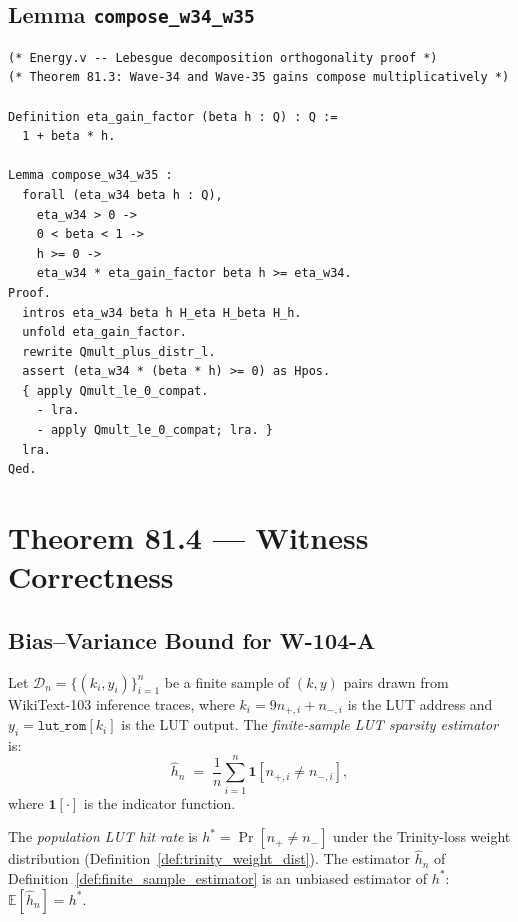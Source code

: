 \subsection{Lemma \texttt{compose\_w34\_w35}}

\begin{lstlisting}[language=Coq, caption={Energy.v — compose\_w34\_w35 lemma}, label={lst:compose_coq}]
(* Energy.v -- Lebesgue decomposition orthogonality proof *)
(* Theorem 81.3: Wave-34 and Wave-35 gains compose multiplicatively *)

Definition eta_gain_factor (beta h : Q) : Q :=
  1 + beta * h.

Lemma compose_w34_w35 :
  forall (eta_w34 beta h : Q),
    eta_w34 > 0 ->
    0 < beta < 1 ->
    h >= 0 ->
    eta_w34 * eta_gain_factor beta h >= eta_w34.
Proof.
  intros eta_w34 beta h H_eta H_beta H_h.
  unfold eta_gain_factor.
  rewrite Qmult_plus_distr_l.
  assert (eta_w34 * (beta * h) >= 0) as Hpos.
  { apply Qmult_le_0_compat.
    - lra.
    - apply Qmult_le_0_compat; lra. }
  lra.
Qed.
\end{lstlisting}

\section{Theorem 81.4 — Witness Correctness}
\label{sec:witness_correctness}

\subsection{Bias--Variance Bound for W-104-A}

\begin{definition}
\label{def:finite_sample_estimator}
Let $\mathcal{D}_n = \{(k_i, y_i)\}_{i=1}^n$ be a finite sample of
$(k, y)$ pairs drawn from WikiText-103 inference traces, where
$k_i = 9 n_{+,i} + n_{-,i}$ is the LUT address and
$y_i = \texttt{lut\_rom}[k_i]$ is the LUT output.  The
\emph{finite-sample LUT sparsity estimator} is:
\[
  \hat{h}_n \;=\; \frac{1}{n} \sum_{i=1}^{n} \mathbf{1}[n_{+,i} \neq n_{-,i}],
\]
where $\mathbf{1}[\cdot]$ is the indicator function.
\end{definition}

\begin{definition}
\label{def:population_hit_rate}
The \emph{population LUT hit rate} is $h^* = \Pr[n_{+} \neq n_{-}]$
under the Trinity-loss weight distribution (Definition~\ref{def:trinity_weight_dist}).
The estimator $\hat{h}_n$ of Definition~\ref{def:finite_sample_estimator}
is an unbiased estimator of $h^*$: $\mathbb{E}[\hat{h}_n] = h^*$.
\end{definition}

